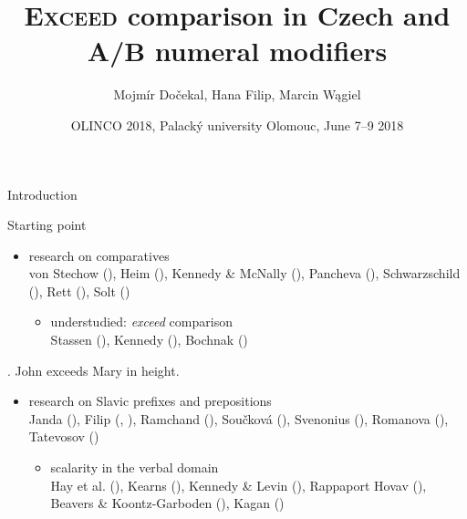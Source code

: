 \documentclass[12pt]{beamer}
\title{\textsc{Exceed} comparison in Czech and A/B numeral modifiers}
\author{Mojmír Dočekal, Hana Filip, Marcin Wągiel}
\date{OLINCO 2018, Palacký university Olomouc, June 7--9 2018}
\begin{document}
	\frame{\titlepage}
	

\begin{frame}{Introduction}

Starting point

\begin{itemize}
\item research on comparatives\\
\scriptsize von Stechow (\citeyear{von_stechow1984comparing}), Heim (\citeyear{heim2000degree}), Kennedy \& McNally (\citeyear{kennedy_mcnally2005scale}), Pancheva (\citeyear{pancheva2006phrasal}), Schwarzschild (\citeyear{schwarzschild2008semantics}), Rett (\citeyear{rett2008degree}), Solt (\citeyear{solt2009semantics})\normalsize
\vspace{0.666em}
\begin{itemize}
\item understudied: \textit{exceed} comparison\\
\scriptsize Stassen (\citeyear{stassen1985comparison}), Kennedy (\citeyear{kennedy2005variation}), Bochnak (\citeyear{bochnak2013crosslinguistic})\normalsize
\end{itemize}
\end{itemize}

\ex. John exceeds Mary in height.

\begin{itemize}
\item research on Slavic prefixes and prepositions\\
\scriptsize Janda (\citeyear{janda1985meaning}), Filip (\citeyear{filip2000quantization}, \citeyear{filip2008events}), Ramchand (\citeyear{ramchand2004time}), Součková (\citeyear{souckova2004there}), Svenonius (\citeyear{svenonius2004slavic}), Romanova (\citeyear{romanova2006constructing}), Tatevosov (\citeyear{tatevosov2004slavic})\normalsize
\vspace{0.666em}
\begin{itemize}
\item scalarity in the verbal domain\\
\scriptsize Hay et al. (\citeyear{hay_kennedy_levin1999scalar}), Kearns (\citeyear{kearns2007telic}), Kennedy \& Levin (\citeyear{kennedy_levin2008measure}), Rappaport Hovav (\citeyear{rappaport-hovav2008lexicalized}), Beavers \& Koontz-Garboden (\citeyear{beavers_koontz-garboden2012manner}), Kagan (\citeyear{kagan2013scalarity})\normalsize
\end{itemize}
\end{itemize}

\end{frame}
\end{document}
